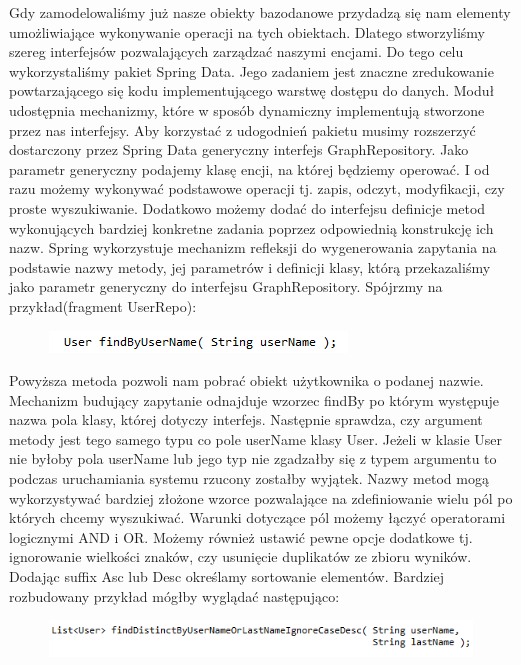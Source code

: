 Gdy zamodelowaliśmy już nasze obiekty bazodanowe przydadzą się nam elementy umożliwiające wykonywanie operacji na tych obiektach. Dlatego stworzyliśmy szereg interfejsów pozwalających zarządzać naszymi encjami. Do tego celu wykorzystaliśmy pakiet Spring Data. Jego zadaniem jest znaczne zredukowanie powtarzającego się kodu implementującego warstwę dostępu do danych. Moduł udostępnia mechanizmy, które w sposób dynamiczny implementują stworzone przez nas interfejsy. Aby korzystać z udogodnień pakietu musimy rozszerzyć dostarczony przez Spring Data generyczny interfejs GraphRepository. Jako parametr generyczny podajemy klasę encji, na której będziemy operować. I od razu możemy wykonywać podstawowe operacji tj. zapis, odczyt, modyfikacji, czy proste wyszukiwanie. Dodatkowo możemy dodać do interfejsu definicje metod wykonujących bardziej konkretne zadania poprzez odpowiednią konstrukcję ich nazw. Spring wykorzystuje mechanizm refleksji do wygenerowania zapytania na podstawie nazwy metody, jej parametrów i definicji klasy, którą przekazaliśmy jako parametr generyczny do interfejsu GraphRepository. Spójrzmy na przykład(fragment UserRepo):

\begin{figure}[H]
	\centering
	\includegraphics{images/findbyusername.png}
\end{figure}


Powyższa metoda pozwoli nam pobrać obiekt użytkownika o podanej nazwie. Mechanizm budujący zapytanie odnajduje wzorzec findBy po którym występuje nazwa pola klasy, której dotyczy interfejs. Następnie sprawdza, czy argument metody jest tego samego typu co pole userName klasy User. Jeżeli w klasie User nie byłoby pola userName lub jego typ nie zgadzałby się z typem argumentu to podczas uruchamiania systemu rzucony zostałby wyjątek. 
Nazwy metod mogą wykorzystywać bardziej złożone wzorce pozwalające na zdefiniowanie wielu pól po których chcemy wyszukiwać. Warunki dotyczące pól możemy łączyć operatorami logicznymi AND i OR.  Możemy również ustawić pewne opcje dodatkowe tj. ignorowanie wielkości znaków, czy usunięcie duplikatów ze zbioru wyników. Dodając suffix Asc lub Desc określamy sortowanie elementów. Bardziej rozbudowany przykład mógłby wyglądać następująco:

\begin{figure}[H]
	\centering
	\includegraphics{images/findlong.png}
\end{figure}


